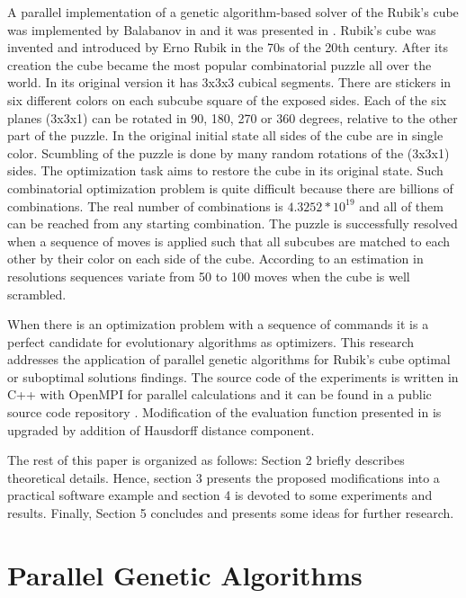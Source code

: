 \documentclass[runningheads]{llncs}
\begin{document}
A parallel implementation of a genetic algorithm-based solver of the Rubik's cube was implemented by Balabanov in \cite{balabanov01} and it was presented in \cite{balabanov02}. Rubik's cube was invented and introduced by Erno Rubik in the 70s of the 20th century. After its creation the cube became the most popular combinatorial puzzle all over the world. In its original version it has 3x3x3 cubical segments. There are stickers in six different colors on each subcube square of the exposed sides. Each of the six planes (3x3x1) can be rotated in 90, 180, 270 or 360 degrees, relative to the other part of the puzzle. In the original initial state all sides of the cube are in single color. Scumbling of the puzzle is done by many random rotations of the (3x3x1) sides. The optimization task aims to restore the cube in its original state. Such combinatorial optimization problem is quite difficult because there are billions of combinations. The real number of combinations is $4.3252*10^{19}$ \cite{korf01} and all of them can be reached from any starting combination. The puzzle is successfully resolved when a sequence of moves is applied such that all subcubes are matched to each other by their color on each side of the cube. According to an estimation in \cite{korf01} resolutions sequences variate from 50 to 100 moves when the cube is well scrambled. 

When there is an optimization problem with a sequence of commands it is a perfect candidate for evolutionary algorithms as optimizers. This research addresses the application of parallel genetic algorithms for Rubik's cube optimal or suboptimal solutions findings. The source code of the experiments is written in C++ with OpenMPI for parallel calculations and it can be found in a public source code repository \cite{balabanov01}. Modification of the evaluation function presented in \cite{balabanov02} is upgraded by addition of Hausdorff distance component.

The rest of this paper is organized as follows: Section 2 briefly describes theoretical details. Hence, section 3 presents the proposed modifications into a practical software example and section 4 is devoted to some experiments and results. Finally, Section 5 concludes and presents some ideas for further research.

\section{Parallel Genetic Algorithms}
\end{document}
